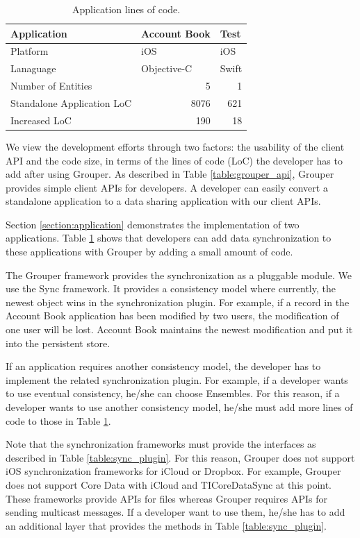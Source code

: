 \documentclass[a4paper,11pt]{report}
\begin{document}
\begin{table}
	\centering
	\caption{Application lines of code.}
	\label{table:loc}
	\begin{tabular}{lll}
		\toprule
		\textbf{Application} & \textbf{Account Book} & \textbf{Test} \\ 
		\midrule
		Platform & iOS & iOS \\ 
		Lanaguage & Objective-C & Swift \\ 
		Number of Entities & \multicolumn{1}{r}{5} & \multicolumn{1}{r}{1} \\ 
		Standalone Application LoC & \multicolumn{1}{r}{8076} & \multicolumn{1}{r}{621} \\ 
		Increased LoC &  \multicolumn{1}{r}{190} &  \multicolumn{1}{r}{18} \\ 
		\bottomrule
	\end{tabular}
\end{table}

We view the development efforts through two factors: the usability of the client API and the code size, in terms of the lines of code (LoC) the developer has to add after using Grouper. 
As described in Table \ref{table:grouper_api}, Grouper provides simple client APIs for developers.
A developer can easily convert a standalone application to a data sharing application with our client APIs.

Section \ref{section:application} demonstrates the implementation of two applications.
Table \ref{table:loc} shows that developers can add data synchronization to these applications with Grouper by adding a small amount of code. 

The Grouper framework provides the synchronization as a pluggable module.
We use the Sync\cite{sync} framework.
It provides a consistency model where currently, the newest object wins in the synchronization plugin.
For example, if a record in the Account Book application has been modified by two users, the modification of one user will be lost.
Account Book maintains the newest modification and put it into the persistent store.

If an application requires another consistency model, the developer has to implement the related synchronization plugin.
For example, if a developer wants to use eventual consistency, he/she can choose Ensembles\cite{ensembles}.
For this reason, if a developer wants to use another consistency model, he/she must add more lines of code to those in Table \ref{table:loc}.

Note that the synchronization frameworks must provide the interfaces as described in Table \ref{table:sync_plugin}.
For this reason, Grouper does not support iOS synchronization frameworks for iCloud or Dropbox.
For example, Grouper does not support Core Data with iCloud\cite{coredata} and TICoreDataSync\cite{ticoredatasyn} at this point.
These frameworks provide APIs for files whereas Grouper requires APIs for sending multicast messages.
If a developer want to use them, he/she has to add an additional layer that provides the methods in Table \ref{table:sync_plugin}.
\end{document}
